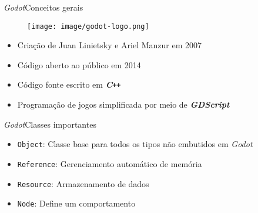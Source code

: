 \begin{frame}{\textit{Godot}}{Conceitos gerais}

\begin{figure}
\texttt{[image: image/godot-logo.png]}
\end{figure}

\begin{itemize}
\item Criação de Juan Linietsky e Ariel Manzur em 2007

\item Código aberto ao público em 2014

\item<2-> Código fonte escrito em \textbf{\textit{C\texttt{++}}}

\item<3-> Programação de jogos simplificada por meio de \textbf{\textit{GDScript}}
\end{itemize}
\end{frame}


\begin{frame}{\textit{Godot}}{Classes importantes}

\begin{itemize}
\item \texttt{Object}: Classe base para todos os tipos não embutidos em \textit{Godot}

\item<2-> \texttt{Reference}: Gerenciamento automático de memória

\item<3-> \texttt{Resource}: Armazenamento de dados

\item<4-> \texttt{Node}: Define um comportamento
\end{itemize}

\end{frame}
